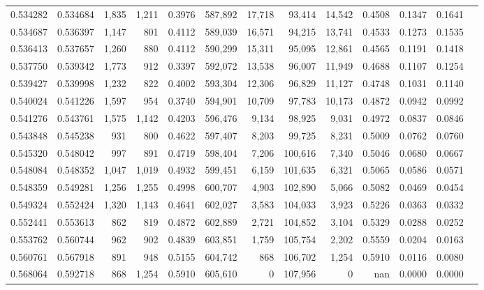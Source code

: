 \begin{tabular}{rrrrrrrrrrrrr}
0.534282 & 0.534684 &  1,835 & 1,211 &                                     0.3976 & 587,892 &  17,718 &  93,414 &  14,542 & 0.4508 & 0.1347 & 0.1641 \\
0.534687 & 0.536397 &  1,147 &   801 &                                     0.4112 & 589,039 &  16,571 &  94,215 &  13,741 & 0.4533 & 0.1273 & 0.1535 \\
0.536413 & 0.537657 &  1,260 &   880 &                                     0.4112 & 590,299 &  15,311 &  95,095 &  12,861 & 0.4565 & 0.1191 & 0.1418 \\
0.537750 & 0.539342 &  1,773 &   912 &                                     0.3397 & 592,072 &  13,538 &  96,007 &  11,949 & 0.4688 & 0.1107 & 0.1254 \\
0.539427 & 0.539998 &  1,232 &   822 &                                     0.4002 & 593,304 &  12,306 &  96,829 &  11,127 & 0.4748 & 0.1031 & 0.1140 \\
0.540024 & 0.541226 &  1,597 &   954 &                                     0.3740 & 594,901 &  10,709 &  97,783 &  10,173 & 0.4872 & 0.0942 & 0.0992 \\
0.541276 & 0.543761 &  1,575 & 1,142 &                                     0.4203 & 596,476 &   9,134 &  98,925 &   9,031 & 0.4972 & 0.0837 & 0.0846 \\
0.543848 & 0.545238 &    931 &   800 &                                     0.4622 & 597,407 &   8,203 &  99,725 &   8,231 & 0.5009 & 0.0762 & 0.0760 \\
0.545320 & 0.548042 &    997 &   891 &                                     0.4719 & 598,404 &   7,206 & 100,616 &   7,340 & 0.5046 & 0.0680 & 0.0667 \\
0.548084 & 0.548352 &  1,047 & 1,019 &                                     0.4932 & 599,451 &   6,159 & 101,635 &   6,321 & 0.5065 & 0.0586 & 0.0571 \\
0.548359 & 0.549281 &  1,256 & 1,255 &                                     0.4998 & 600,707 &   4,903 & 102,890 &   5,066 & 0.5082 & 0.0469 & 0.0454 \\
0.549324 & 0.552424 &  1,320 & 1,143 &                                     0.4641 & 602,027 &   3,583 & 104,033 &   3,923 & 0.5226 & 0.0363 & 0.0332 \\
0.552441 & 0.553613 &    862 &   819 &                                     0.4872 & 602,889 &   2,721 & 104,852 &   3,104 & 0.5329 & 0.0288 & 0.0252 \\
0.553762 & 0.560744 &    962 &   902 &                                     0.4839 & 603,851 &   1,759 & 105,754 &   2,202 & 0.5559 & 0.0204 & 0.0163 \\
0.560761 & 0.567918 &    891 &   948 &                                     0.5155 & 604,742 &     868 & 106,702 &   1,254 & 0.5910 & 0.0116 & 0.0080 \\
0.568064 & 0.592718 &    868 & 1,254 &                                     0.5910 & 605,610 &       0 & 107,956 &       0 &    nan & 0.0000 & 0.0000 \\
\bottomrule
\end{tabular}
